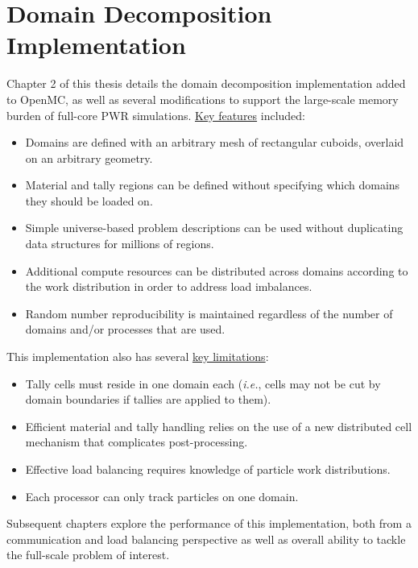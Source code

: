 \documentclass[12pt,twoside]{mitthesis-exec}
\begin{document}
\section*{Domain Decomposition Implementation}

Chapter 2 of this thesis details the domain decomposition implementation added
to OpenMC, as well as several modifications to support the large-scale memory
burden of full-core PWR simulations. \ul{Key features} included:

\begin{itemize}
  \item Domains are defined with an arbitrary mesh of rectangular cuboids, overlaid on an
  arbitrary geometry.
  \item Material and tally regions can be defined without specifying which domains they should be loaded on.
  \item Simple universe-based problem descriptions can be used without
  duplicating data structures for millions of regions.
  \item Additional compute resources can be distributed across domains according
  to the work distribution in order to address load imbalances.
  \item Random number reproducibility is maintained regardless of the number of
  domains and/or processes that are used.
\end {itemize}

This implementation also has several \ul{key limitations}:

\begin{itemize}
  \item Tally cells must reside in one domain each (\emph{i.e.}, cells may not
  be cut by domain boundaries if tallies are applied to them).
  \item Efficient material and tally handling relies on the use of a new
  distributed cell mechanism that complicates post-processing.
  \item Effective load balancing requires knowledge of particle work
  distributions.
  \item Each processor can only track particles on one domain.
\end {itemize}

Subsequent chapters explore the performance of this implementation, both from a
communication and load balancing perspective as well as overall ability to
tackle the full-scale problem of interest.
\end{document}
